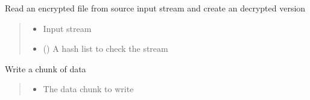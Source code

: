 \documentclass[letterpaper,10pt,english]{sphinxmanual}
\begin{document}
\begin{savenotes}
\begin{fulllineitems}
\begin{savenotes}\begin{fulllineitems}
\label{\detokenize{eezz:eezz.filesrv.TEezzFile.read}}
\pysigstartsignatures
{}
\pysigstopsignatures
\sphinxAtStartPar
Read an encrypted file from source input stream and create an decrypted version
\begin{quote}\begin{description}
\begin{itemize}
\item {} 
\sphinxAtStartPar
{} \textendash{} Input stream

\item {} 
\sphinxAtStartPar
{} (\sphinxstyleliteralemphasis{\sphinxupquote{{[}}}\sphinxstyleliteralemphasis{\sphinxupquote{{]}}}) \textendash{} A hash list to check the stream

\end{itemize}

\end{description}\end{quote}

\end{fulllineitems}\end{savenotes}


\begin{savenotes}\begin{fulllineitems}
\label{\detokenize{eezz:eezz.filesrv.TEezzFile.write}}
\pysigstartsignatures
{}
\pysigstopsignatures
\sphinxAtStartPar
Write a chunk of data
\begin{quote}\begin{description}
\begin{itemize}
\item {} 
\sphinxAtStartPar
{} \textendash{} The data chunk to write


\end{itemize}
\end{description}
\end{quote}
\end{fulllineitems}
\end{savenotes}
\end{fulllineitems}
\end{savenotes}
\end{document}
